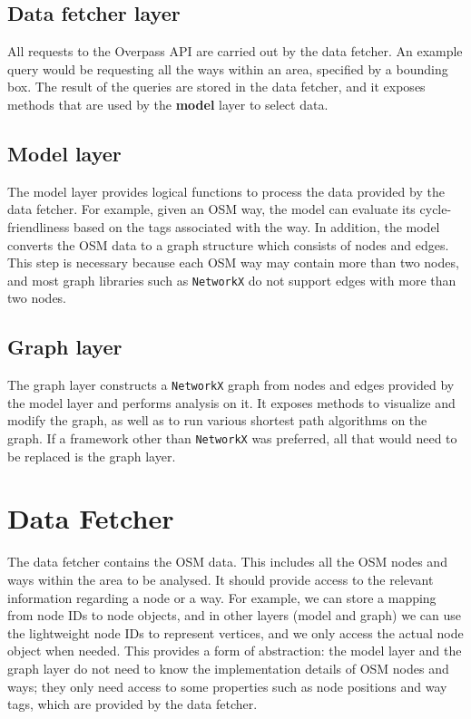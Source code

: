 \documentclass[12pt,a4paper]{report}
\begin{document}
\subsection{Data fetcher layer}
All requests to the Overpass API are carried out by the data fetcher. An example query would be requesting all the ways within an area, specified by a bounding box. The result of the queries are stored in the data fetcher, and it exposes methods that are used by the \textbf{model} layer to select data.

\subsection{Model layer}
The model layer provides logical functions to process the data provided by the data fetcher. For example, given an OSM way, the model can evaluate its cycle-friendliness based on the tags associated with the way. In addition, the model converts the OSM data to a graph structure which consists of nodes and edges. This step is necessary because each OSM way may contain more than two nodes, and most graph libraries such as \texttt{NetworkX} do not support edges with more than two nodes. 

\subsection{Graph layer}
The graph layer constructs a \texttt{NetworkX} graph from nodes and edges provided by the model layer and performs analysis on it. It exposes methods to visualize and modify the graph, as well as to run various shortest path algorithms on the graph. If a framework other than \texttt{NetworkX} was preferred, all that would need to be replaced is the graph layer.

\section{Data Fetcher}
The data fetcher contains the OSM data. This includes all the OSM nodes and ways within the area to be analysed. It should provide access to the relevant information regarding a node or a way. For example, we can store a mapping from node IDs to node objects, and in other layers (model and graph) we can use the lightweight node IDs to represent vertices, and we only access the actual node object when needed. This provides a form of abstraction: the model layer and the graph layer do not need to know the implementation details of OSM nodes and ways; they only need access to some properties such as node positions and way tags, which are provided by the data fetcher.
\end{document}
